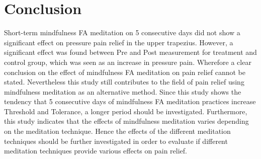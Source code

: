 \section{Conclusion}
Short-term mindfulness FA meditation on 5 consecutive days did not show a significant effect on pressure pain relief in the upper trapezius. However, a significant effect was found between Pre and Post measurement for treatment and control group, which was seen as an increase in pressure pain.
Wherefore a clear conclusion on the effect of mindfulness FA meditation on pain relief cannot be stated. Nevertheless this study still contributes to the field of pain relief using mindfulness meditation as an alternative method. Since this study shows the tendency that 5 consecutive days of mindfulness FA meditation practices increase Threshold and Tolerance, a longer period should be investigated. Furthermore, this study indicates that the effects of mindfulness meditation varies depending on the meditation technique. Hence the effects of the different meditation techniques should be further investigated in order to evaluate if different meditation techniques provide various effects on pain relief. 